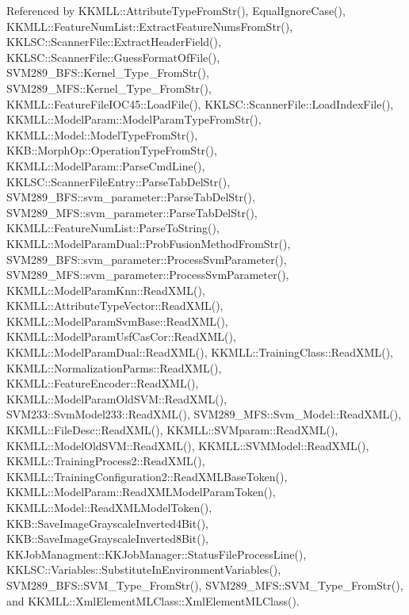 Referenced by K\+K\+M\+L\+L\+::\+Attribute\+Type\+From\+Str(), Equal\+Ignore\+Case(), K\+K\+M\+L\+L\+::\+Feature\+Num\+List\+::\+Extract\+Feature\+Nums\+From\+Str(), K\+K\+L\+S\+C\+::\+Scanner\+File\+::\+Extract\+Header\+Field(), K\+K\+L\+S\+C\+::\+Scanner\+File\+::\+Guess\+Format\+Of\+File(), S\+V\+M289\+\_\+\+B\+F\+S\+::\+Kernel\+\_\+\+Type\+\_\+\+From\+Str(), S\+V\+M289\+\_\+\+M\+F\+S\+::\+Kernel\+\_\+\+Type\+\_\+\+From\+Str(), K\+K\+M\+L\+L\+::\+Feature\+File\+I\+O\+C45\+::\+Load\+File(), K\+K\+L\+S\+C\+::\+Scanner\+File\+::\+Load\+Index\+File(), K\+K\+M\+L\+L\+::\+Model\+Param\+::\+Model\+Param\+Type\+From\+Str(), K\+K\+M\+L\+L\+::\+Model\+::\+Model\+Type\+From\+Str(), K\+K\+B\+::\+Morph\+Op\+::\+Operation\+Type\+From\+Str(), K\+K\+M\+L\+L\+::\+Model\+Param\+::\+Parse\+Cmd\+Line(), K\+K\+L\+S\+C\+::\+Scanner\+File\+Entry\+::\+Parse\+Tab\+Del\+Str(), S\+V\+M289\+\_\+\+B\+F\+S\+::svm\+\_\+parameter\+::\+Parse\+Tab\+Del\+Str(), S\+V\+M289\+\_\+\+M\+F\+S\+::svm\+\_\+parameter\+::\+Parse\+Tab\+Del\+Str(), K\+K\+M\+L\+L\+::\+Feature\+Num\+List\+::\+Parse\+To\+String(), K\+K\+M\+L\+L\+::\+Model\+Param\+Dual\+::\+Prob\+Fusion\+Method\+From\+Str(), S\+V\+M289\+\_\+\+B\+F\+S\+::svm\+\_\+parameter\+::\+Process\+Svm\+Parameter(), S\+V\+M289\+\_\+\+M\+F\+S\+::svm\+\_\+parameter\+::\+Process\+Svm\+Parameter(), K\+K\+M\+L\+L\+::\+Model\+Param\+Knn\+::\+Read\+X\+M\+L(), K\+K\+M\+L\+L\+::\+Attribute\+Type\+Vector\+::\+Read\+X\+M\+L(), K\+K\+M\+L\+L\+::\+Model\+Param\+Svm\+Base\+::\+Read\+X\+M\+L(), K\+K\+M\+L\+L\+::\+Model\+Param\+Usf\+Cas\+Cor\+::\+Read\+X\+M\+L(), K\+K\+M\+L\+L\+::\+Model\+Param\+Dual\+::\+Read\+X\+M\+L(), K\+K\+M\+L\+L\+::\+Training\+Class\+::\+Read\+X\+M\+L(), K\+K\+M\+L\+L\+::\+Normalization\+Parms\+::\+Read\+X\+M\+L(), K\+K\+M\+L\+L\+::\+Feature\+Encoder\+::\+Read\+X\+M\+L(), K\+K\+M\+L\+L\+::\+Model\+Param\+Old\+S\+V\+M\+::\+Read\+X\+M\+L(), S\+V\+M233\+::\+Svm\+Model233\+::\+Read\+X\+M\+L(), S\+V\+M289\+\_\+\+M\+F\+S\+::\+Svm\+\_\+\+Model\+::\+Read\+X\+M\+L(), K\+K\+M\+L\+L\+::\+File\+Desc\+::\+Read\+X\+M\+L(), K\+K\+M\+L\+L\+::\+S\+V\+Mparam\+::\+Read\+X\+M\+L(), K\+K\+M\+L\+L\+::\+Model\+Old\+S\+V\+M\+::\+Read\+X\+M\+L(), K\+K\+M\+L\+L\+::\+S\+V\+M\+Model\+::\+Read\+X\+M\+L(), K\+K\+M\+L\+L\+::\+Training\+Process2\+::\+Read\+X\+M\+L(), K\+K\+M\+L\+L\+::\+Training\+Configuration2\+::\+Read\+X\+M\+L\+Base\+Token(), K\+K\+M\+L\+L\+::\+Model\+Param\+::\+Read\+X\+M\+L\+Model\+Param\+Token(), K\+K\+M\+L\+L\+::\+Model\+::\+Read\+X\+M\+L\+Model\+Token(), K\+K\+B\+::\+Save\+Image\+Grayscale\+Inverted4\+Bit(), K\+K\+B\+::\+Save\+Image\+Grayscale\+Inverted8\+Bit(), K\+K\+Job\+Managment\+::\+K\+K\+Job\+Manager\+::\+Status\+File\+Process\+Line(), K\+K\+L\+S\+C\+::\+Variables\+::\+Substitute\+In\+Environment\+Variables(), S\+V\+M289\+\_\+\+B\+F\+S\+::\+S\+V\+M\+\_\+\+Type\+\_\+\+From\+Str(), S\+V\+M289\+\_\+\+M\+F\+S\+::\+S\+V\+M\+\_\+\+Type\+\_\+\+From\+Str(), and K\+K\+M\+L\+L\+::\+Xml\+Element\+M\+L\+Class\+::\+Xml\+Element\+M\+L\+Class().


